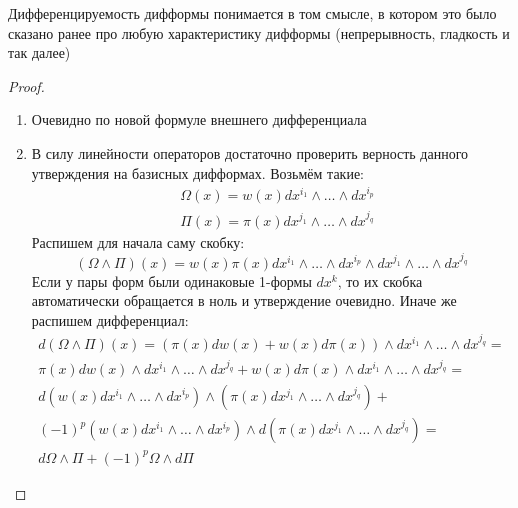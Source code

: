 \begin{note}
	Дифференцируемость дифформы понимается в том смысле, в котором это было сказано ранее про любую характеристику дифформы (непрерывность, гладкость и так далее)
\end{note}

\begin{proof}~
	\begin{enumerate}
		\item Очевидно по новой формуле внешнего дифференциала
		
		\item В силу линейности операторов достаточно проверить верность данного утверждения на базисных дифформах. Возьмём такие:
		\begin{align*}
			&{\Omega(x) = w(x)dx^{i_1} \wedge \ldots \wedge dx^{i_p}}
			\\
			&{\Pi(x) = \pi(x) dx^{j_1} \wedge \ldots \wedge dx^{j_q}}
		\end{align*}
		Распишем для начала саму скобку:
		\[
			(\Omega \wedge \Pi)(x) = w(x)\pi(x) dx^{i_1} \wedge \ldots \wedge dx^{i_p} \wedge dx^{j_1} \wedge \ldots \wedge dx^{j_q}
		\]
		Если у пары форм были одинаковые 1-формы $dx^k$, то их скобка автоматически обращается в ноль и утверждение очевидно. Иначе же распишем дифференциал:
		\begin{multline*}
			d(\Omega \wedge \Pi)(x) = (\pi(x)dw(x) + w(x)d\pi(x)) \wedge dx^{i_1} \wedge \ldots \wedge dx^{j_q} =
			\\
			\pi(x)dw(x) \wedge dx^{i_1} \wedge \ldots \wedge dx^{j_q} + w(x)d\pi(x) \wedge dx^{i_1} \wedge \ldots \wedge dx^{j_q} =
			\\
			d(w(x)dx^{i_1} \wedge \ldots \wedge dx^{i_p}) \wedge (\pi(x)dx^{j_1} \wedge \ldots \wedge dx^{j_q}) +
			\\
			(-1)^p (w(x)dx^{i_1} \wedge \ldots \wedge dx^{i_p}) \wedge d(\pi(x)dx^{j_1} \wedge \ldots \wedge dx^{j_q}) =
			\\
			d\Omega \wedge \Pi + (-1)^p \Omega \wedge d\Pi
		\end{multline*}
		

\end{enumerate}
\end{proof}
